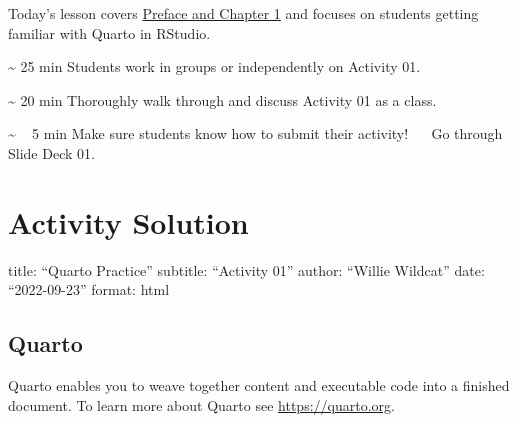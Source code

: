 \documentclass[
  letterpaper,
  DIV=11,
  numbers=noendperiod]{scrreprt}
\begin{document}
Today's lesson covers
\href{https://nustat.github.io/intro-stat-data-sci/}{Preface and Chapter
1} and focuses on students getting familiar with Quarto in RStudio.

\begin{tcolorbox}[enhanced jigsaw, toptitle=1mm, colback=white, arc=.35mm, rightrule=.15mm, titlerule=0mm, left=2mm, breakable, bottomtitle=1mm, bottomrule=.15mm, leftrule=.75mm, title={Agenda}, colframe=quarto-callout-note-color-frame, opacitybacktitle=0.6, toprule=.15mm, colbacktitle=quarto-callout-note-color!10!white, coltitle=black, opacityback=0]
\textasciitilde{} 25 min Students work in groups or independently on
Activity 01.

\textasciitilde{} 20 min Thoroughly walk through and discuss Activity 01
as a class.

\textasciitilde{} ~ 5 min Make sure students know how to submit their
activity! ~~ Go through Slide Deck 01.
\end{tcolorbox}

\hypertarget{activity-solution}{%
\section*{Activity Solution}\label{activity-solution}}

\begin{tcolorbox}[enhanced jigsaw, toptitle=1mm, colback=white, arc=.35mm, rightrule=.15mm, titlerule=0mm, left=2mm, breakable, bottomtitle=1mm, bottomrule=.15mm, leftrule=.75mm, title={Task 2}, colframe=quarto-callout-important-color-frame, opacitybacktitle=0.6, toprule=.15mm, colbacktitle=quarto-callout-important-color!10!white, coltitle=black, opacityback=0]
title: ``Quarto Practice'' subtitle: ``Activity 01'' author: ``Willie
Wildcat'' date: ``2022-09-23'' format: html
\end{tcolorbox}

\hypertarget{quarto}{%
\subsection*{Quarto}\label{quarto}}

Quarto enables you to weave together content and executable code into a
finished document. To learn more about Quarto see
\url{https://quarto.org}.
\end{document}
